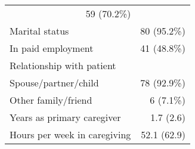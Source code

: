 \begin{table}[!h]
\begin{tabular}{ll}
  \multicolumn{1}{r}{59 (70.2\%)} \\
\multicolumn{1}{l}{\hspace{1em}Marital status} &
  \multicolumn{1}{r}{80 (95.2\%)} \\
\multicolumn{1}{l}{\hspace{1em}In paid employment} &
  \multicolumn{1}{r}{41 (48.8\%)} \\
\multicolumn{1}{l}{\hspace{1em}Relationship with patient} &
  \multicolumn{1}{r}{} \\
\multicolumn{1}{l}{\hspace{2em}Spouse/partner/child} &
  \multicolumn{1}{r}{78 (92.9\%)} \\
\multicolumn{1}{l}{\hspace{2em}Other family/friend} &
  \multicolumn{1}{r}{6 (7.1\%)} \\
\multicolumn{1}{l}{\hspace{1em}Years as primary caregiver} &
  \multicolumn{1}{r}{1.7 (2.6)} \\
\multicolumn{1}{l}{\hspace{1em}Hours per week in caregiving} &
  \multicolumn{1}{r}{52.1 (62.9)} \\
\cline{1-2}
\end{tabular}
\end{table}
